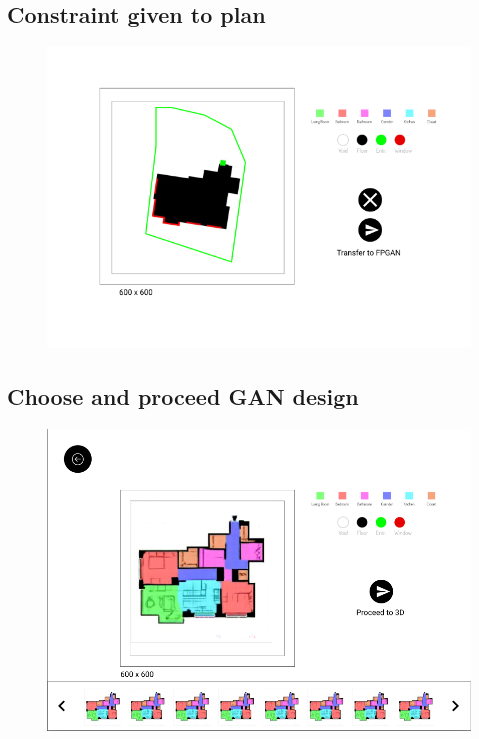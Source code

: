 	\subsection{Constraint given to plan} \label{Appendix: Constraint given to plan}
		\begin{figure}[H]
			\centering
				\includegraphics[width=1\textwidth]{img/chapter_7/constraint.png}
				
		\end{figure}
	\subsection{Choose and proceed GAN design} \label{Appendix: Choose and proceed GAN design}
		\begin{figure}[H]
			\centering
				\includegraphics[width=1\textwidth]{img/chapter_7/choose.png}
				
		\end{figure}
